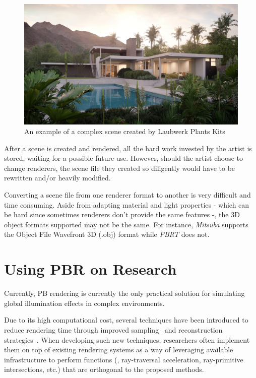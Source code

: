 \begin{figure}[h]
  
\includegraphics[width=\textwidth,height=\textheight,keepaspectratio]{../images/1_introduction/Laubwerk-Kit-12_Bauclassroom-Exterior}
  \caption{An example of a complex scene created by Laubwerk Plants Kits}
  \label{fig:intro_complexScene}
\end{figure}

After a scene is created and rendered, all the hard work invested by the artist 
is stored, waiting for a possible future use. However, should the artist choose 
to change renderers, the scene file they created so diligently would have to be 
rewritten and/or heavily modified.

Converting a scene file from one renderer format to another is very difficult 
and time consuming. Aside from adapting material and light properties - which 
can be hard since sometimes renderers don't provide the same features -, the 3D 
object formats supported may not be the same. For instance, \textit{Mitsuba} 
supports the Object File Wavefront 3D (.obj) format while \textit{PBRT} does 
not.

\section{Using PBR on Research}

Currently, PB rendering is currently the only practical solution for simulating 
global illumination effects in complex environments.

Due to its high computational cost, several techniques have been introduced to 
reduce rendering time through improved sampling~\cite{Heck2013, Pilleboue:2015} 
and reconstruction strategies~\cite{Sen2012, Rousselle2013, Kalantari2015, 
Bitterli2016}. When developing such new techniques, researchers often implement 
them on top of existing rendering systems as a way of leveraging available 
infrastructure to perform functions (\eg, ray-traversal acceleration, 
ray-primitive intersections, etc.) that are orthogonal to the proposed methods.

